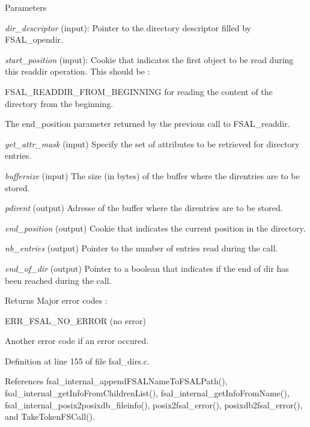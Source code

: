 \begin{DoxyParams}{Parameters}
\item[{\em dir\_\-descriptor}](input): Pointer to the directory descriptor filled by FSAL\_\-opendir. \item[{\em start\_\-position}](input): Cookie that indicates the first object to be read during this readdir operation. This should be :
\begin{DoxyItemize}
\item FSAL\_\-READDIR\_\-FROM\_\-BEGINNING for reading the content of the directory from the beginning.
\item The end\_\-position parameter returned by the previous call to FSAL\_\-readdir. 
\end{DoxyItemize}\item[{\em get\_\-attr\_\-mask}](input) Specify the set of attributes to be retrieved for directory entries. \item[{\em buffersize}](input) The size (in bytes) of the buffer where the direntries are to be stored. \item[{\em pdirent}](output) Adresse of the buffer where the direntries are to be stored. \item[{\em end\_\-position}](output) Cookie that indicates the current position in the directory. \item[{\em nb\_\-entries}](output) Pointer to the number of entries read during the call. \item[{\em end\_\-of\_\-dir}](output) Pointer to a boolean that indicates if the end of dir has been reached during the call.\end{DoxyParams}
\begin{DoxyReturn}{Returns}
Major error codes :
\begin{DoxyItemize}
\item ERR\_\-FSAL\_\-NO\_\-ERROR (no error)
\item Another error code if an error occured. 
\end{DoxyItemize}
\end{DoxyReturn}


Definition at line 155 of file fsal\_\-dirs.c.

References fsal\_\-internal\_\-appendFSALNameToFSALPath(), fsal\_\-internal\_\-getInfoFromChildrenList(), fsal\_\-internal\_\-getInfoFromName(), fsal\_\-internal\_\-posix2posixdb\_\-fileinfo(), posix2fsal\_\-error(), posixdb2fsal\_\-error(), and TakeTokenFSCall().